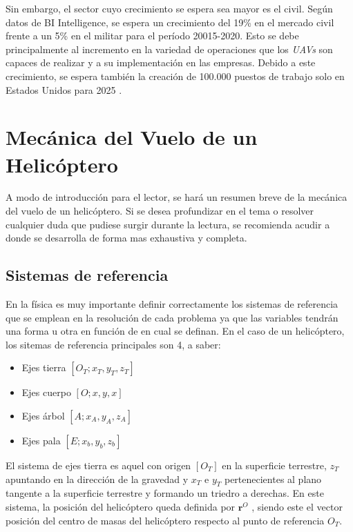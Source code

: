 Sin embargo, el sector cuyo crecimiento se espera sea mayor es el civil. Según datos de BI Intelligence, se espera un crecimiento del 19\% en el mercado civil frente a un 5\% en el militar para el período 20015-2020.
Esto se debe principalmente al incremento en la variedad de operaciones que los \emph{UAVs} son capaces de realizar y a su implementación en las empresas. Debido a este crecimiento, se espera también la creación de 100.000 puestos de trabajo solo en Estados Unidos para 2025 \citep{AUVSI}.\\

\section{Mecánica del Vuelo de un Helicóptero}

A modo de introducción para el lector, se hará un resumen breve de la mecánica del vuelo de un helicóptero. Si se desea profundizar en el tema o resolver cualquier duda que pudiese surgir durante la lectura, se recomienda acudir a \citet{Cuerva} donde se desarrolla de forma mas exhaustiva y completa.\\

\subsection{Sistemas de referencia}
En la física es muy importante definir correctamente los sistemas de referencia que se emplean en la resolución de cada problema ya que las variables tendrán una forma u otra en función de en cual se definan.
En el caso de un helicóptero, los sitemas de referencia principales son 4, a saber:
\begin{itemize}
	\item Ejes tierra $[O_{T};x_{T},y_{T},z_{T}]$
	\item Ejes cuerpo $[O;x,y,x]$
	\item Ejes árbol $[A;x_{A},y_{A},z_{A}]$
	\item Ejes pala $[E;x_{b},y_{b},z_{b}]$
\end{itemize}

El sistema de ejes tierra es aquel con origen $[O_{T}]$ en la superficie terrestre, $z_{T}$ apuntando en la dirección de la gravedad y $x_{T}$ e $y_{T}$ pertenecientes al plano tangente a la superficie terrestre y formando un triedro a derechas. En este sistema, la posición del helicóptero queda definida por $\textbf{r}^{O}$ , siendo este el vector posición del centro de masas del helicóptero respecto al punto de referencia $O_{T}$.\\

